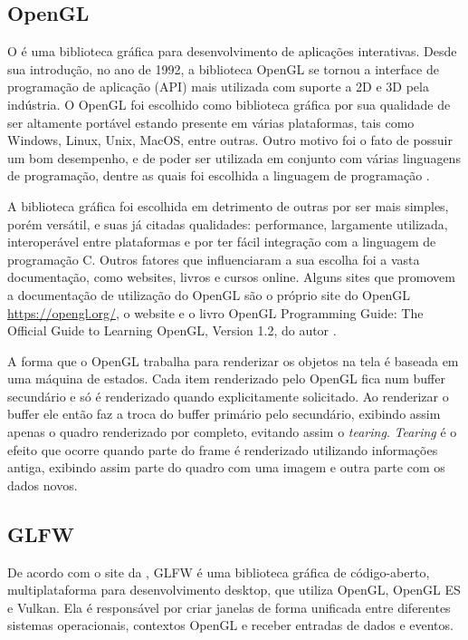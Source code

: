 \documentclass[12pt, %
openright,
oneside, %
a4paper,    %
brazil]{facom-ufu-abntex2}
\begin{document}
\subsection{OpenGL}
O  é uma biblioteca gráfica para desenvolvimento de aplicações interativas. Desde sua introdução, no ano de 1992, a biblioteca OpenGL se tornou a interface de programação de aplicação (API) mais utilizada com suporte a 2D e 3D pela indústria. O OpenGL foi escolhido como biblioteca gráfica por sua qualidade de ser altamente portável estando presente em várias plataformas, tais como Windows, Linux, Unix, MacOS, entre outras. Outro motivo foi o fato de possuir um bom desempenho, e de poder ser utilizada em conjunto com várias linguagens de programação, dentre as quais foi escolhida a linguagem de programação .

A biblioteca gráfica  foi escolhida em detrimento de outras por ser mais simples, porém versátil, e suas já citadas qualidades: performance, largamente utilizada, interoperável entre plataformas e por ter fácil integração com a linguagem de programação C. Outros fatores que influenciaram a sua escolha foi a vasta documentação, como websites, livros e cursos online. Alguns sites que promovem a documentação de utilização do OpenGL são o próprio site do OpenGL \url{https://opengl.org/}, o website  e o livro OpenGL Programming Guide: The Official Guide to Learning OpenGL, Version 1.2, do autor .

A forma que o OpenGL trabalha para renderizar os objetos na tela é baseada em uma máquina de estados. Cada item renderizado pelo OpenGL fica num buffer secundário e só é renderizado quando explicitamente solicitado. Ao renderizar o buffer ele então faz a troca do buffer primário pelo secundário, exibindo assim apenas o quadro renderizado por completo, evitando assim o \textit{tearing}. \textit{Tearing} é o efeito que ocorre quando parte do frame é renderizado utilizando informações antiga, exibindo assim parte do quadro com uma imagem e outra parte com os dados novos.

\subsection{GLFW}
De acordo com o site da , GLFW é uma biblioteca gráfica de código-aberto, multiplataforma para desenvolvimento desktop, que utiliza OpenGL, OpenGL ES e Vulkan. Ela é responsável por criar janelas de forma unificada entre diferentes sistemas operacionais, contextos OpenGL e receber entradas de dados e eventos.
\end{document}
